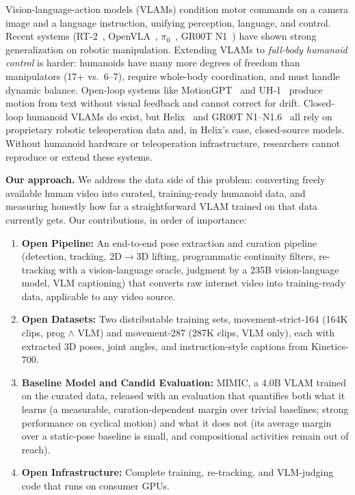 \documentclass[letterpaper, 10pt, conference]{ieeeconf}
\begin{document}
Vision-language-action models (VLAMs) condition motor commands on a camera image and a language instruction, unifying perception, language, and control. Recent systems (RT-2~\cite{rt2}, OpenVLA~\cite{openvla}, $\pi_0$~\cite{pi0}, GR00T N1~\cite{groot}) have shown strong generalization on robotic manipulation. Extending VLAMs to \emph{full-body humanoid control} is harder: humanoids have many more degrees of freedom than manipulators (17+ vs.\ 6--7), require whole-body coordination, and must handle dynamic balance. Open-loop systems like MotionGPT~\cite{motiongpt} and UH-1~\cite{uh1} produce motion from text without visual feedback and cannot correct for drift. Closed-loop humanoid VLAMs do exist, but Helix~\cite{helix} and GR00T N1--N1.6~\cite{groot,groot_n15,groot_n16} all rely on proprietary robotic teleoperation data and, in Helix's case, closed-source models. Without humanoid hardware or teleoperation infrastructure, researchers cannot reproduce or extend these systems.

\textbf{Our approach.} We address the data side of this problem: converting freely available human video into curated, training-ready humanoid data, and measuring honestly how far a straightforward VLAM trained on that data currently gets. Our contributions, in order of importance:

\begin{enumerate}
    \item \textbf{Open Pipeline:} An end-to-end pose extraction and curation pipeline (detection, tracking, 2D$\to$3D lifting, programmatic continuity filters, re-tracking with a vision-language oracle, judgment by a 235B vision-language model, VLM captioning) that converts raw internet video into training-ready data, applicable to any video source.
    \item \textbf{Open Datasets:} Two distributable training sets, movement-strict-164 (164K clips, prog $\land$ VLM) and movement-287 (287K clips, VLM only), each with extracted 3D poses, joint angles, and instruction-style captions from Kinetics-700.
    \item \textbf{Baseline Model and Candid Evaluation:} MIMIC, a 4.0B VLAM trained on the curated data, released with an evaluation that quantifies both what it learns (a measurable, curation-dependent margin over trivial baselines; strong performance on cyclical motion) and what it does not (its average margin over a static-pose baseline is small, and compositional activities remain out of reach).
    \item \textbf{Open Infrastructure:} Complete training, re-tracking, and VLM-judging code that runs on consumer GPUs.
\end{enumerate}
\end{document}
